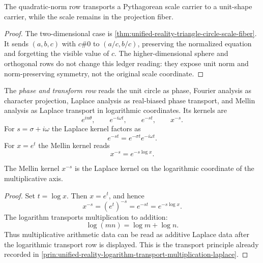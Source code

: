 \begin{theorem}
\label{thm:unified-reality-quadratic-normalization-scale-shape}
The quadratic-norm row transports a Pythagorean scale carrier to a
unit-shape carrier, while the scale remains in the projection fiber.
\end{theorem}

\begin{proof}
The two-dimensional case is
\autoref{thm:unified-reality-triangle-circle-scale-fiber}. It sends
$(a,b,c)$ with $c\#0$ to $(a/c,b/c)$, preserving the normalized equation
and forgetting the visible value of $c$. The higher-dimensional sphere
and orthogonal rows do not change this ledger reading: they expose unit
norm and norm-preserving symmetry, not the original scale coordinate.
\end{proof}

\begin{definition}
\label{def:unified-reality-phase-transform-atlas-row}
The \emph{phase and transform row} reads the unit circle as phase,
Fourier analysis as character projection, Laplace analysis as real-biased
phase transport, and Mellin analysis as Laplace transport in logarithmic
coordinates. Its kernels are
$$
e^{in\theta},
\qquad
e^{-i\omega t},
\qquad
e^{-st},
\qquad
x^{-s}.
$$
For $s=\sigma+i\omega$ the Laplace kernel factors as
$$
e^{-st}=e^{-\sigma t}e^{-i\omega t}.
$$
For $x=e^t$ the Mellin kernel reads
$$
x^{-s}=e^{-s\log x}.
$$
\end{definition}

\begin{theorem}
\label{thm:unified-reality-mellin-logarithmic-laplace-transport}
The Mellin kernel $x^{-s}$ is the Laplace kernel on the logarithmic
coordinate of the multiplicative axis.
\end{theorem}

\begin{proof}
Set $t=\log x$. Then $x=e^t$, and hence
$$
x^{-s}=(e^t)^{-s}=e^{-st}=e^{-s\log x}.
$$
The logarithm transports multiplication to addition:
$$
\log(mn)=\log m+\log n.
$$
Thus multiplicative arithmetic data can be read as additive Laplace data
after the logarithmic transport row is displayed. This is the transport
principle already recorded in
\autoref{prin:unified-reality-logarithm-transport-multiplication-laplace}.
\end{proof}

